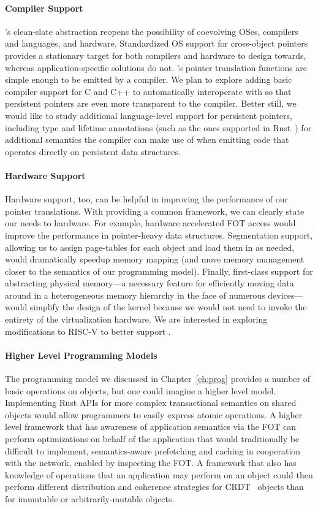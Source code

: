 \paragraph{Compiler Support}
\Twizzler's clean-slate \NVM abstraction reopens the possibility of coevolving OSes, compilers and
languages, and hardware.
Standardized OS support for cross-object pointers provides a stationary target for both
compilers and hardware to design towards, whereas application-specific solutions do not.
\Twizzler's pointer translation functions are simple enough to be emitted by a compiler. We plan
to explore adding basic compiler support for C and C++ to automatically interoperate with
\Twizzler so that persistent pointers are even more transparent to the compiler. Better still,
we would like to study additional language-level support for persistent pointers, including type
and lifetime annotations (such as the ones supported in Rust~\cite{rust}) for additional semantics the
compiler can make use of when emitting code that operates directly on persistent data
structures.

\paragraph{Hardware Support}
Hardware support, too, can be helpful in improving the performance of our pointer translations.
With \Twizzler providing a common framework, we can clearly state our needs to hardware. For
example, hardware accelerated FOT access would improve the performance in pointer-heavy data
structures. Segmentation support, allowing us to assign page-tables for each object and load
them in as needed, would dramatically speedup memory mapping (and move memory management closer
to the semantics of our programming model). Finally, first-class support for abstracting
physical memory---a necessary feature for efficiently moving data around in a heterogeneous
memory hierarchy in the face of numerous devices---would simplify the design of the kernel
because we would not need to invoke the entirety of the virtualization hardware. We are
interested in exploring modifications to RISC-V to better support \Twizzler.

\paragraph{Higher Level Programming Models}

The programming model we discussed in Chapter~\ref{ch:prog} provides a number of basic operations on objects, but one
could imagine a higher level model. Implementing Rust APIs for more complex transactional semantics on shared objects
would allow programmers to easily express atomic operations. A higher level framework that has awareness of application
semantics via the FOT can perform optimizations on behalf of the application that would traditionally be difficult to
implement, \eg semantics-aware prefetching and caching in cooperation with the network, enabled by inspecting the FOT. A
framework that also has knowledge of operations that an application may perform on an object could then perform
different distribution and coherence strategies for CRDT~\cite{shapiro2011comprehensive} objects than for immutable or
arbitrarily-mutable objects.

